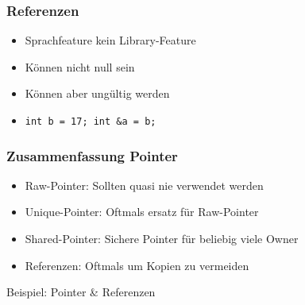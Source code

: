 \documentclass[aspectratio=169]{beamer}
\begin{document}
\begin{frame}
    \frametitle{Referenzen}
    \begin{itemize}
        \item Sprachfeature kein Library-Feature
            \pause
        \item Können nicht null sein
            \pause
        \item Können aber ungültig werden
            \pause
        \item
            \lstinline{int b = 17; int &a = b;}
    \end{itemize}
\end{frame}

\begin{frame}
    \frametitle{Zusammenfassung Pointer}
    \begin{itemize}
        \item Raw-Pointer: Sollten quasi nie verwendet werden
            \pause
        \item Unique-Pointer: Oftmals ersatz für Raw-Pointer
            \pause
        \item Shared-Pointer: Sichere Pointer für beliebig viele Owner
            \pause
        \item Referenzen: Oftmals um Kopien zu vermeiden
    \end{itemize}
\end{frame}

\begin{frame}
    \Huge{Beispiel: Pointer \& Referenzen}
\end{frame}
\end{document}
